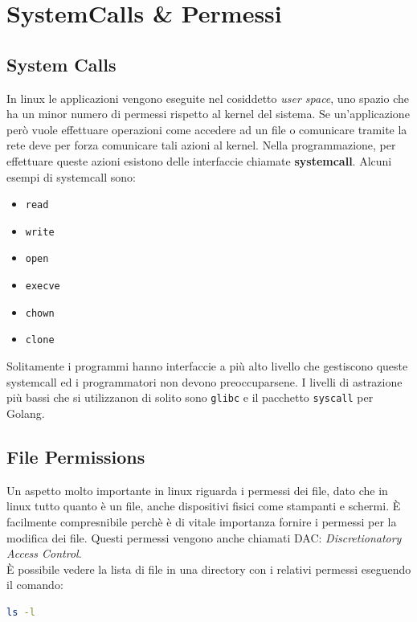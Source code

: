 \chapter{SystemCalls \& Permessi}

\section{System Calls}

In linux le applicazioni vengono eseguite nel cosiddetto \textit{user space},
uno spazio che ha un minor numero di permessi rispetto al kernel del sistema.
Se un'applicazione però vuole effettuare operazioni come accedere ad un file
o comunicare tramite la rete deve per forza comunicare tali azioni al kernel.
Nella programmazione, per effettuare queste azioni esistono delle interfaccie
chiamate \textbf{systemcall}. Alcuni esempi di systemcall sono:

\begin{itemize}
    \item \verb|read|
    \item \verb|write|
    \item \verb|open|
    \item \verb|execve|
    \item \verb|chown|
    \item \verb|clone|
\end{itemize}

Solitamente i programmi hanno interfaccie a più alto livello che gestiscono queste
systemcall ed i programmatori non devono preoccuparsene. I livelli di astrazione
più bassi che si utilizzanon di solito sono \verb|glibc| e il pacchetto
\verb|syscall| per Golang.

\section{File Permissions}

Un aspetto molto importante in linux riguarda i permessi dei file, dato che in
linux tutto quanto è un file, anche dispositivi fisici come stampanti e schermi.
È facilmente compresnibile perchè è di vitale importanza fornire i permessi per
la modifica dei file. Questi permessi vengono anche chiamati DAC:
\textit{Discretionatory Access Control}.\\

È possibile vedere la lista di file in una directory con i relativi permessi
eseguendo il comando:

\begin{lstlisting}[language=Bash]
    ls -l
\end{lstlisting}

